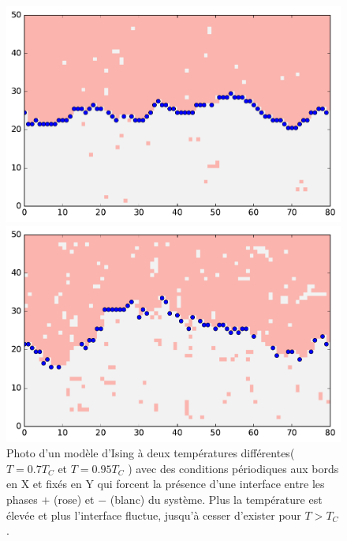 \begin{figure}
	\begin{minipage}[t]{0.5\linewidth}
		\includegraphics[width=\linewidth]{isingtosos/snap07.pdf}
	\end{minipage}%
	\begin{minipage}[t]{0.5\linewidth}
		\includegraphics[width=\linewidth]{isingtosos/snap09.pdf}
	\end{minipage}
	\caption{Photo d'un modèle d'Ising à deux températures différentes($T=0.7 T_C$ et $T=0.95 T_C$ ) avec des conditions périodiques aux bords en X et fixés en Y qui forcent la présence d'une interface entre les phases $+$ (rose) et $-$ (blanc) du système. Plus la température est élevée et plus l'interface fluctue, jusqu'à cesser d'exister pour $T \greater T_C$. }
	\label{amas-fixe}
\end{figure}  
  
